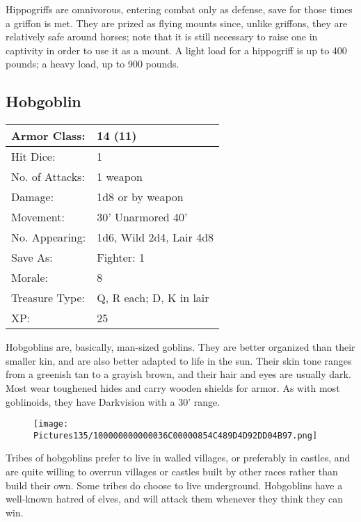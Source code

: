 \documentclass[a4paper,twoside,openany,10pt]{book}
\begin{document}
\begin{multicols}{2}
Hippogriffs are omnivorous, entering combat only as defense, save for those times a griffon is met. They are prized as flying mounts since, unlike griffons, they are relatively safe around horses; note that it is still necessary to raise one in captivity in order to use it as a mount. A light load for a hippogriff is up to 400 pounds; a heavy load, up to 900 pounds.

\subsection*{Hobgoblin}\label{hobgoblin}

\begin{tabularx}{0.50\textwidth}{@{}lX@{}}
Armor Class: & 14 (11) \\\hline
Hit Dice: & 1 \\\hline
No. of Attacks: & 1 weapon \\\hline
Damage: & 1d8 or by weapon \\\hline
Movement: & 30' Unarmored 40' \\\hline
No. Appearing: & 1d6, Wild 2d4, Lair 4d8 \\\hline
Save As: & Fighter: 1 \\\hline
Morale: & 8 \\\hline
Treasure Type: & Q, R each; D, K in lair \\\hline
XP: & 25 \\\hline
\end{tabularx}

Hobgoblins are, basically, man-sized goblins. They are better organized than their smaller kin, and are also better adapted to life in the sun. Their skin tone ranges from a greenish tan to a grayish brown, and their hair and eyes are usually dark. Most wear toughened hides and carry wooden shields for armor. As with most goblinoids, they have Darkvision with a 30' range.

\begin{wrapfigure}{r}{0.25\textwidth}
	\texttt{[image: Pictures135/100000000000036C00000854C489D4D92DD04B97.png]}
\end{wrapfigure}

Tribes of hobgoblins prefer to live in walled villages, or preferably in castles, and are quite willing to overrun villages or castles built by other races rather than build their own. Some tribes do choose to live underground. Hobgoblins have a well-known hatred of elves, and will attack them whenever they think they can win.


\end{multicols}
\end{document}
